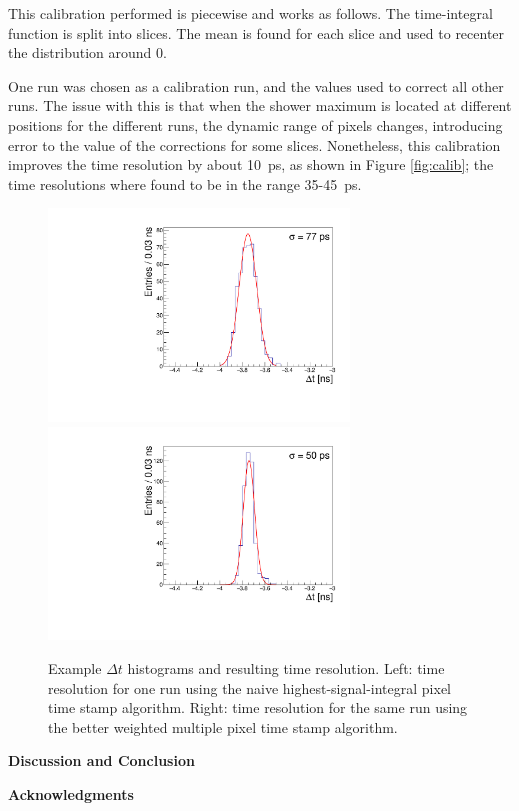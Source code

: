 \documentclass[twocolumn]{article}
\begin{document}
This calibration performed is piecewise and works as follows. The time-integral function is split into slices. The mean is found for each slice and used to recenter the distribution around 0.

One run was chosen as a calibration run, and the values used to correct all other runs. The issue with this is that when the shower maximum is located at different positions for the different runs, the dynamic range of pixels changes, introducing error to the value of the corrections for some slices. Nonetheless, this calibration improves the time resolution by about \SI{10}{\pico\second}, as shown in Figure \ref{fig:calib}; the time resolutions where found to be in the range 35-\SI{45}{\pico\second}.

\begin{figure}[htbp]
	\centering
	\includegraphics[width=8cm]{Images/exdt/exdtHI.pdf}
	\includegraphics[width=8cm]{Images/exdt/exdtWI.pdf}
	\caption{\small Example $\Delta t$ histograms and resulting time resolution. Left: time resolution for one run using the naive highest-signal-integral pixel time stamp algorithm. Right: time resolution for the same run using the better weighted multiple pixel time stamp algorithm.}
	\label{fig:exdt}
\end{figure}

\title{\large}{\textbf{Discussion and Conclusion}}




\renewcommand{\refname}{\textbf\selectfont\normalsize References}
\begin{thebibliography}{9}
\bibitem{}

\bibitem{}


\bibitem{}


\bibitem{}


\end{thebibliography}

\title{\large}{\textbf{Acknowledgments}}
\end{document}
